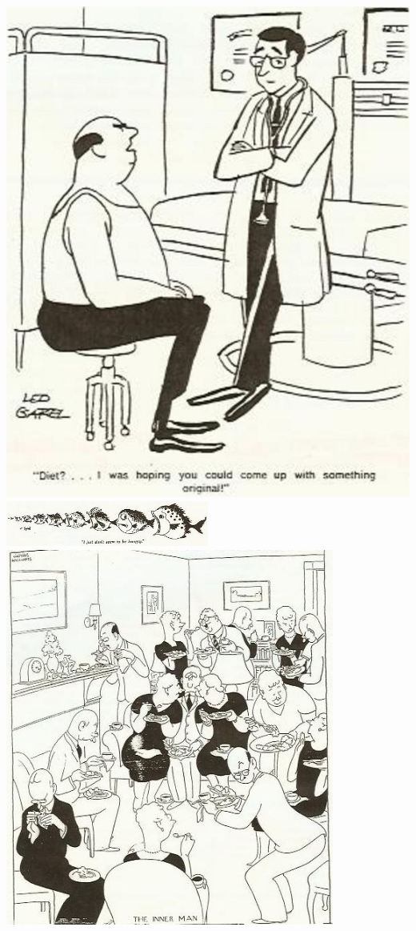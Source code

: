 \documentclass[landscape,twocolumn,letterpaper]{article}
\begin{document}
\includegraphics[height=0.4\textheight,bb=0 0 600 730]{./p15.jpg}
\clearpage%
\includegraphics[width=0.5\textwidth,bb= 0 0 465 104]{./p19.jpg}
\clearpage%
\includegraphics[width=4.25in,bb= 0 0 454 521]{./p20.jpg}
\end{document}
